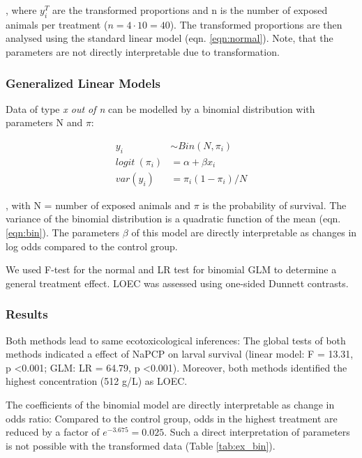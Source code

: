 \documentclass{scrartcl}
\begin{document}
, where $y_i^T$ are the transformed proportions and n is the number of exposed animals per treatment ($n = 4 \cdot 10=40$).
The transformed proportions are then analysed using the standard linear model (eqn. \ref{eqn:normal}).
Note, that the parameters are not directly interpretable due to transformation.


\subsubsection{Generalized Linear Models}
Data of type \emph{x out of n} can be modelled by a binomial distribution with parameters N and $\pi$:

\begin{align}
  y_i &\sim Bin(N, \pi_i) \nonumber \\
  logit~(\pi_i) &= \alpha + \beta x_i \label{eqn:bin} \\
  var(y_i) &=  \pi_i (1 - \pi_i) / N \nonumber
\end{align}

, with N = number of exposed animals and $\pi$ is the probability of survival.
The variance of the binomial distribution is a quadratic function of the mean (eqn. \ref{eqn:bin}).
The parameters $\beta$ of this model are directly interpretable as changes in log odds compared to the control group.

We used F-test for the normal and LR test for binomial GLM to determine a general treatment effect.
LOEC was assessed using one-sided Dunnett contrasts.


\subsubsection{Results}
Both methods lead to same ecotoxicological inferences:
The global tests of both methods indicated a effect of NaPCP on larval survival (linear model: F = 13.31, p \textless 0.001; GLM: LR = 64.79, p \textless 0.001).
Moreover, both methods identified the highest concentration (512 \textmu g/L) as LOEC. 

The coefficients of the binomial model are directly interpretable as change in odds ratio:
Compared to the control group, odds in the highest treatment are reduced by a factor of $e^{-3.675} = 0.025$.
Such a direct interpretation of parameters is not possible with the transformed data (Table \ref{tab:ex_bin}).
\end{document}
